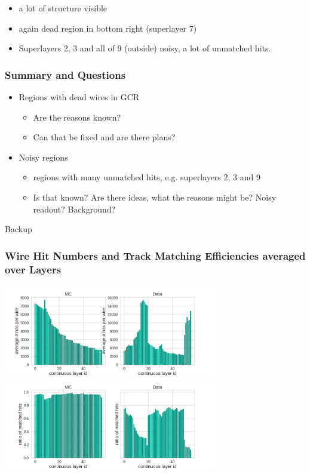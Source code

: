 \documentclass[18pt]{beamer}
\begin{document}
\begin{frame}
\begin{columns}
\begin{column}{0.5\textwidth}
    \end{column}
  \end{columns}
  \begin{itemize}
  \item a lot of structure visible
  \item again dead region in bottom right (superlayer 7)
  \item Superlayers 2, 3 and all of 9 (outside) noisy, a lot of unmatched hits. 
  \end{itemize}
\end{frame}

\begin{frame}
  \frametitle{Summary and Questions}\label{lastbeforebackup}
  \begin{itemize}
  \item Regions with dead wires in GCR
    \begin{itemize}
    \item Are the reasons known?
    \item Can that be fixed and are there plans?
    \end{itemize}
  \item Noisy regions
    \begin{itemize}
    \item regions with many unmatched hits, e.g. superlayers 2, 3 and 9
    \item Is that known? Are there ideas, what the reasons might be? Noisy readout? Background?
    \end{itemize}
  \end{itemize}
\end{frame}

\begin{frame}
  \begin{center}
    \huge Backup
  \end{center}
\end{frame}

\begin{frame}
  \frametitle{Wire Hit Numbers and Track Matching Efficiencies averaged over Layers}
  \centering
  \includegraphics[width=0.7\textwidth]{figures/hit_efficiency_by_wire/hits_plotted_by_clayer.png}\\
  \includegraphics[width=0.7\textwidth]{figures/hit_efficiency_by_wire/hit_ratio_matched_plotted_by_clayer.png}
\end{frame}
\end{document}
